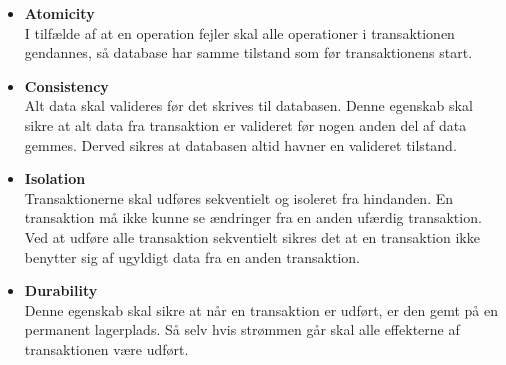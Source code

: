 \begin{itemize}
	\item \textbf{Atomicity} \\
		I tilfælde af at en operation fejler skal alle operationer i transaktionen gendannes, så database har samme tilstand som før transaktionens start. 

	\item \textbf{Consistency} \\
		Alt data skal valideres før det skrives til databasen. Denne egenskab skal sikre at alt data fra transaktion er valideret før nogen anden del af data gemmes. Derved sikres at databasen altid havner en valideret tilstand.

	\item \textbf{Isolation} \\
		Transaktionerne skal udføres sekventielt og isoleret fra hindanden. En transaktion må ikke kunne se ændringer fra en anden ufærdig transaktion. Ved at udføre alle transaktion sekventielt sikres det at en transaktion ikke benytter sig af ugyldigt data fra en anden transaktion.

	\item \textbf{Durability} \\
		Denne egenskab skal sikre at når en transaktion er udført, er den gemt på en permanent lagerplads. Så selv hvis strømmen går skal alle effekterne af transaktionen være udført.
\end{itemize}

